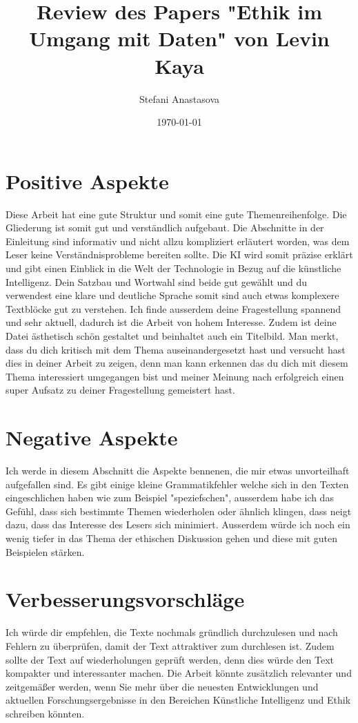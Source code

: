 \documentclass{article}
\title{Review des Papers "Ethik im Umgang mit Daten" von Levin Kaya}
\author{Stefani Anastasova}
\date{\today}
\begin{document}
\maketitle

\section{Positive Aspekte}

Diese Arbeit hat eine gute Struktur und somit eine gute Themenreihenfolge. Die Gliederung ist somit gut und verständlich aufgebaut.  Die Abschnitte in der Einleitung sind informativ und nicht allzu kompliziert erläutert worden, 
was dem Leser keine Verständnisprobleme bereiten sollte. Die KI wird somit präzise erklärt und gibt einen Einblick in die Welt der Technologie in Bezug auf die künstliche Intelligenz.
Dein Satzbau und Wortwahl sind beide gut gewählt und du verwendest eine klare und deutliche Sprache somit sind auch etwas komplexere Textblöcke gut zu verstehen. Ich finde ausserdem deine Fragestellung spannend und sehr aktuell, dadurch ist die Arbeit von hohem Interesse.
Zudem ist deine Datei ästhetisch schön gestaltet und beinhaltet auch ein Titelbild. Man merkt, dass du dich kritisch mit dem Thema auseinandergesetzt hast und versucht hast dies in deiner Arbeit zu zeigen, 
denn man kann erkennen das du dich mit diesem Thema interessiert umgegangen bist und meiner Meinung nach erfolgreich einen super Aufsatz zu deiner Fragestellung gemeistert hast. 


\section{Negative Aspekte}
Ich werde in diesem Abschnitt die Aspekte bennenen, die mir etwas unvorteilhaft aufgefallen sind.
Es gibt einige kleine Grammatikfehler welche sich in den Texten eingeschlichen haben wie zum Beispiel "speziefschen", ausserdem habe ich das Gefühl, dass sich bestimmte Themen wiederholen oder ähnlich klingen, dass neigt dazu,
dass das Interesse des Lesers sich minimiert. Ausserdem würde ich noch ein wenig tiefer in das Thema der ethischen Diskussion gehen und diese mit guten Beispielen stärken. 


\section{Verbesserungsvorschläge}
Ich würde dir empfehlen, die Texte nochmals gründlich durchzulesen und nach Fehlern zu überprüfen, damit der Text attraktiver zum durchlesen ist. 
Zudem sollte der Text auf wiederholungen geprüft werden, denn dies würde den Text kompakter und interessanter machen. 
Die Arbeit könnte zusätzlich relevanter und zeitgemäßer werden, wenn Sie mehr über die neuesten Entwicklungen und aktuellen Forschungsergebnisse in den Bereichen Künstliche Intelligenz und Ethik schreiben könnten.
\end{document}

